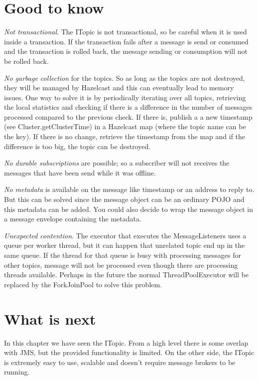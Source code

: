\section{Good to know}

\emph{Not transactional}. The ITopic is not transactional, so be careful when it is used inside a transaction. If the transaction fails after a message is send or consumed and the transaction is rolled back, the message sending or consumption will not be rolled back.

\emph{No garbage collection} for the topics. So as long as the topics are not destroyed, they will be managed by Hazelcast and this can eventually lead to memory issues. One way to solve it is by periodically iterating over all topics, retrieving the local statistics and checking if there is a difference in the number of messages processed compared to the previous check. If there is, publish a a new timestamp (see Cluster.getClusterTime) in a Hazelcast map (where the topic name can be the key). If there is no change, retrieve the timestamp from the map and if the difference is too big, the topic can be destroyed.

\emph{No durable subscriptions} are possible; so a subscriber will not receives the messages that have been send while it was offline.

\emph{No metadata} is available on the message like timestamp or an address to reply to. But this can be solved since the message object can be an ordinary POJO and this metadata can be added. You could also decide to wrap the message object in a message envelope containing the metadata.

\emph{Unexpected contention}. The executor that executes the MessageListeners uses a queue per worker thread, but it can happen that unrelated topic end up in the same queue. If the thread for that queue is busy with processing messages for other topics, message will not be processed even though there are processing threads available. Perhaps in the future the normal ThreadPoolExecutor will be replaced by the ForkJoinPool to solve this problem.

\section{What is next}
In this chapter we have seen the ITopic. From a high level there is some overlap with JMS, but the provided functionality is limited. On the other side, the ITopic is extremely easy to use, scalable and doesn't require message brokers to be running.
